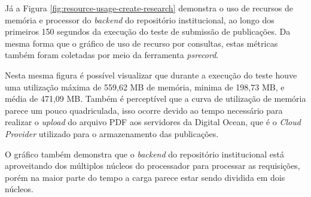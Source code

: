 Já a Figura \ref{fig:resource-usage-create-research} demonstra o uso de recursos
de memória e processor do \emph{backend} do repositório institucional, ao longo
dos primeiros 150 segundos da execução do teste de submissão de publicações.
Da mesma forma que o gráfico de uso de recurso por consultas, estas métricas
também foram coletadas por meio da ferramenta \emph{psrecord}.

Nesta mesma figura é possível visualizar que durante a execução do teste houve uma
utilização máxima de 559,62 MB de memória, minima de 198,73 MB, e média de 471,09 MB.
Também é perceptível que a curva de utilização de memória parece um pouco quadriculada,
isso ocorre devido ao tempo necessário para realizar o \emph{upload} do arquivo PDF
aos servidores da Digital Ocean, que é o \emph{Cloud Provider} utilizado para o
armazenamento das publicações.

O gráfico também demonstra que o \emph{backend} do repositório institucional
está aproveitando dos múltiplos núcleos do processador para processar as requisições,
porém na maior parte do tempo a carga parece estar sendo dividida em dois núcleos.
